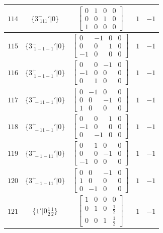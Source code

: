 \documentclass[fleqn,8pt]{jsarticle}
\begin{document}
\begin{longtable}{ccccc}
$ 114 $ & $ \{3^{-}_{\,\,111}{}'|0\} $ & $ \begin{bmatrix} 0 & 1 & 0 & 0 \\ 0 & 0 & 1 & 0 \\ 1 & 0 & 0 & 0 \end{bmatrix} $ & $ 1 $ & $ -1 $ \\ \hline
$ 115 $ & $ \{3^{-}_{\,\,1-1-1}{}'|0\} $ & $ \begin{bmatrix} 0 & -1 & 0 & 0 \\ 0 & 0 & 1 & 0 \\ -1 & 0 & 0 & 0 \end{bmatrix} $ & $ 1 $ & $ -1 $ \\ \hline
$ 116 $ & $ \{3^{+}_{\,\,1-1-1}{}'|0\} $ & $ \begin{bmatrix} 0 & 0 & -1 & 0 \\ -1 & 0 & 0 & 0 \\ 0 & 1 & 0 & 0 \end{bmatrix} $ & $ 1 $ & $ -1 $ \\ \hline
$ 117 $ & $ \{3^{-}_{\,\,-11-1}{}'|0\} $ & $ \begin{bmatrix} 0 & -1 & 0 & 0 \\ 0 & 0 & -1 & 0 \\ 1 & 0 & 0 & 0 \end{bmatrix} $ & $ 1 $ & $ -1 $ \\ \hline
$ 118 $ & $ \{3^{+}_{\,\,-11-1}{}'|0\} $ & $ \begin{bmatrix} 0 & 0 & 1 & 0 \\ -1 & 0 & 0 & 0 \\ 0 & -1 & 0 & 0 \end{bmatrix} $ & $ 1 $ & $ -1 $ \\ \hline
$ 119 $ & $ \{3^{-}_{\,\,-1-11}{}'|0\} $ & $ \begin{bmatrix} 0 & 1 & 0 & 0 \\ 0 & 0 & -1 & 0 \\ -1 & 0 & 0 & 0 \end{bmatrix} $ & $ 1 $ & $ -1 $ \\ \hline
$ 120 $ & $ \{3^{+}_{\,\,-1-11}{}'|0\} $ & $ \begin{bmatrix} 0 & 0 & -1 & 0 \\ 1 & 0 & 0 & 0 \\ 0 & -1 & 0 & 0 \end{bmatrix} $ & $ 1 $ & $ -1 $ \\ \hline
$ 121 $ & $ \{1{}'|0 \frac{1}{2} \frac{1}{2}\} $ & $ \begin{bmatrix} 1 & 0 & 0 & 0 \\ 0 & 1 & 0 & \frac{1}{2} \\ 0 & 0 & 1 & \frac{1}{2} \end{bmatrix} $ & $ 1 $ & $ -1 $ \\ \hline

\end{longtable}
\end{document}
